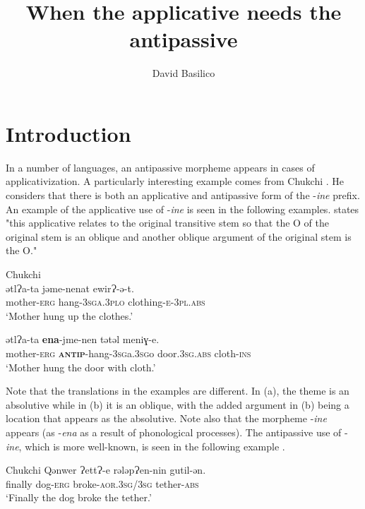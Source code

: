 \documentclass[output=paper,colorlinks,citecolor=brown,modfonts,nonflat]{langsci/langscibook}
\author{David Basilico\affiliation{University of Alabama at Birmingham}}
\title{When the applicative needs the antipassive}
\begin{document}
\maketitle


\section{Introduction} %

In a number of languages, an antipassive morpheme appears in cases of applicativization.
 A particularly interesting example comes from Chukchi \citep{Dunn1999}. He considers that there is both an applicative and antipassive form of the -\textit{ine} prefix. An example of the applicative use of -\textit{ine} is seen in the following examples. \citet[214]{Dunn1999} states "this applicative relates to the original transitive stem so that the O of the original stem is an oblique and another oblique argument of the original stem is the O."

\ea%
	Chukchi \citep{Dunn1999}\\
    \label{ex:basilico:1}
    \ea \label{ex:basilico:1a}
    \gll ǝtlɁa-ta  jǝme-nenat    ewirɁ-ǝ-t.\\
        mother-\textsc{erg}  hang-\textsc{3sga}.\textsc{3plo} clothing-\textsc{e}-\textsc{3pl}.\textsc{abs}\\
    \glt ‘Mother hung up the clothes.’

    \ex \label{ex:basilico:1b}
    \gll ǝtlɁa-ta \textbf{ena}-jme-nen tǝtǝl meniɣ-e.\\
    mother-\textsc{erg}  \textbf{\textsc{antip}}-hang-\textsc{3sg}a.\textsc{3sg}o  door.\textsc{3sg}.\textsc{abs} cloth-\textsc{ins}\\
    \glt ‘Mother hung the door with cloth.'
    \z
    \z

Note that the translations in the examples are different. In (a), the theme is an absolutive while in (b) it is an oblique, with the added argument in (b) being a location that appears as the absolutive. Note also that the morpheme -\textit{ine} appears (as -\textit{ena} as a result of phonological processes). The antipassive use of -\textit{ine}, which is more well-known, is seen in the following example .


   \ea Chukchi \citep{KozinskyNedjalkovPolinskaja1988} \label{ex:basilico:2}
    \ea \label{ex:basilico:2a}
    \gll Qǝnwer  ɁettɁ-e  rǝlǝpɁen-nin    gutil-ǝn. \\
    finally  dog-\textsc{erg} broke-\textsc{aor}.\textsc{3sg}/\textsc{3sg}  tether{}-\textsc{abs}\\
    \glt ‘Finally the dog broke the tether.’
\end{document}
